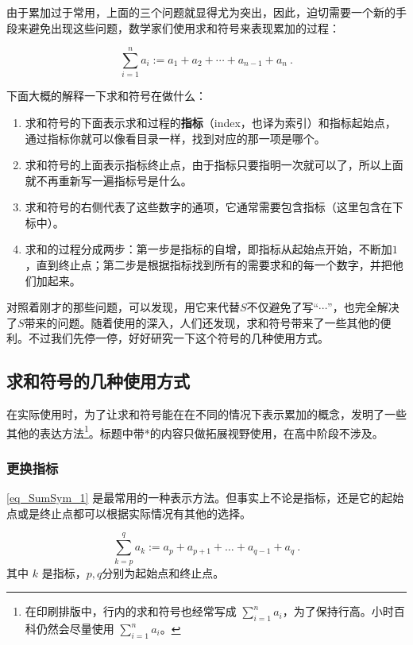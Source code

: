 由于累加过于常用，上面的三个问题就显得尤为突出，因此，迫切需要一个新的手段来避免出现这些问题，数学家们使用求和符号来表现累加的过程：

\begin{equation}\label{eq_SumSym_1}
\sum_{i=1}^n a_i:=a_1+a_2+\cdots+a_{n-1}+a_{n}~.
\end{equation}

下面大概的解释一下求和符号在做什么：
\begin{enumerate}
\item 求和符号的下面表示求和过程的\textbf{指标}（index，也译为索引）和指标起始点，通过指标你就可以像看目录一样，找到对应的那一项是哪个。
\item 求和符号的上面表示指标终止点，由于指标只要指明一次就可以了，所以上面就不再重新写一遍指标号是什么。
\item 求和符号的右侧代表了这些数字的通项，它通常需要包含指标（这里包含在下标中）。
\item 求和的过程分成两步：第一步是指标的自增，即指标从起始点开始，不断加$1$，直到终止点；第二步是根据指标找到所有的需要求和的每一个数字，并把他们加起来。
\end{enumerate}

对照着刚才的那些问题，可以发现，用它来代替$S$不仅避免了写“$\cdots$”，也完全解决了$S$带来的问题。随着使用的深入，人们还发现，求和符号带来了一些其他的便利。不过我们先停一停，好好研究一下这个符号的几种使用方式。

\subsection{求和符号的几种使用方式}

在实际使用时，为了让求和符号能在在不同的情况下表示累加的概念，发明了一些其他的表达方法\footnote{在印刷排版中，行内的求和符号也经常写成 $\sum_{i=1}^n a_i$，为了保持行高。小时百科仍然会尽量使用 $\sum\limits_{i=1}^n a_i$。}。标题中带*的内容只做拓展视野使用，在高中阶段不涉及。

\subsubsection{更换指标}

\autoref{eq_SumSym_1} 是最常用的一种表示方法。但事实上不论是指标，还是它的起始点或是终止点都可以根据实际情况有其他的选择。

\begin{equation}
\sum_{k=p}^q a_k := a_p + a_{p+1} + \dots +a_{q-1}+ a_q~.
\end{equation}
其中 $k$ 是指标，$p,q$分别为起始点和终止点。

